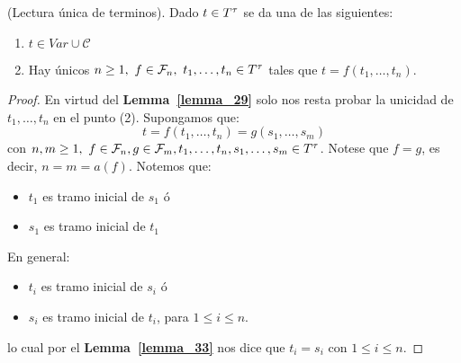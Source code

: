   \begin{theorem} \label{lemma_34}
    \PN (Lectura única de terminos). Dado $t \in T^{\tau}$ se da una de las siguientes:
    \begin{enumerate}[(1)]
      \item $t \in Var \cup \mathcal{C}$
      \item Hay únicos $n \geq 1, \ f \in \mathcal{F}_{n}, \ t_{1}, \dotsc, t_{n} \in T^{\tau}$ tales que $t = f(t_{1},
        \dotsc, t_{n})$.
    \end{enumerate}
  \end{theorem}
  \begin{proof}
    \PN En virtud del \textbf{Lemma~\ref{lemma_29}} solo nos resta probar la unicidad de $t_{1}, \dotsc, t_{n}$ en el
    punto (2). Supongamos que:
    \[
      t = f(t_{1}, \dotsc, t_{n}) = g(s_{1}, \dotsc, s_{m})
    \]
    \PN con $n, m \geq 1, \ f \in \mathcal{F}_{n}, g \in \mathcal{F}_{m}, t_{1}, \dotsc, t_{n}, s_{1}, \dotsc, s_{m} \in
    T^{\tau}$. Notese que $f = g$, es decir, $n = m = a(f)$. Notemos que:
    \begin{itemize}
      \item $t_{1}$ es tramo inicial de $s_{1}$ ó
      \item $s_{1}$ es tramo inicial de $t_{1}$
    \end{itemize}

    \PN En general:
    \begin{itemize}
      \item $t_{i}$ es tramo inicial de $s_{i}$ ó
      \item $s_{i}$ es tramo inicial de $t_{i}$, para $1 \leq i \leq n$.
    \end{itemize}


    \PN lo cual por el \textbf{Lemma~\ref{lemma_33}} nos dice que $t_{i} = s_{i}$ con $1 \leq i \leq n$.
  \end{proof}

